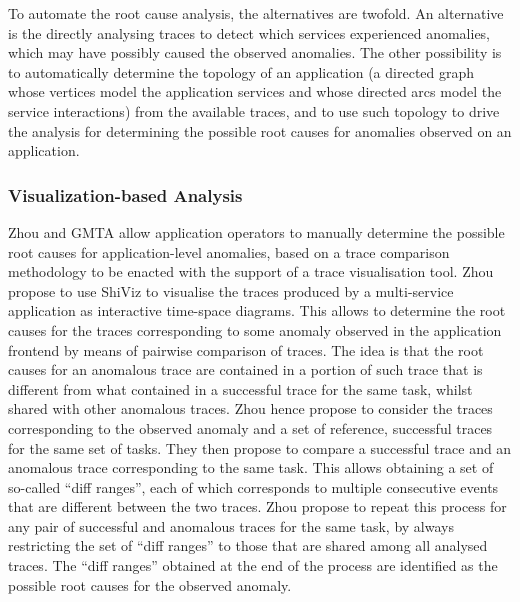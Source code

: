 To automate the root cause analysis, the alternatives are twofold.
An alternative is the directly analysing traces to detect which services experienced anomalies, which may have possibly caused the observed anomalies.
The other possibility is to automatically determine the topology of an application (\viz a directed graph whose vertices model the application services and whose directed arcs model the service interactions) from the available traces, and to use such topology to drive the analysis for determining the possible root causes for anomalies observed on an application.

\subsubsection{{Visualization-based Analysis}}
Zhou \etal \cite{01_Zhou2021_FaultAnalysisDebuggingMicroservices} and GMTA \cite{45_Guo2020_GMTA} allow application operators to manually determine the possible root causes for application-level anomalies, based on a trace comparison methodology to be enacted with the support of a trace visualisation tool.
Zhou \etal \cite{01_Zhou2021_FaultAnalysisDebuggingMicroservices} propose to use ShiViz \cite{Beschastnikh2016_ShiViz} to visualise the traces produced by a multi-service application as interactive time-space diagrams.
This allows to determine the root causes for the traces corresponding to some anomaly observed in the application frontend by means of pairwise comparison of traces.
The idea is that the root causes for an anomalous trace are contained in a portion of such trace that is different from what contained in a successful trace for the same task, whilst shared with other anomalous traces. 
Zhou \etal \cite{01_Zhou2021_FaultAnalysisDebuggingMicroservices} hence propose to consider the traces corresponding to the observed anomaly and a set of reference, successful traces for the same set of tasks. 
They then propose to compare a successful trace and an anomalous trace corresponding to the same task. 
This allows obtaining a set of so-called \enquote{diff ranges}, each of which corresponds to multiple consecutive events that are different between the two traces. 
Zhou \etal \cite{01_Zhou2021_FaultAnalysisDebuggingMicroservices} propose to repeat this process for any pair of successful and anomalous traces for the same task, by always restricting the set of \enquote{diff ranges} to those that are shared among all analysed traces. 
The \enquote{diff ranges} obtained at the end of the process are identified as the possible root causes for the observed anomaly. 

